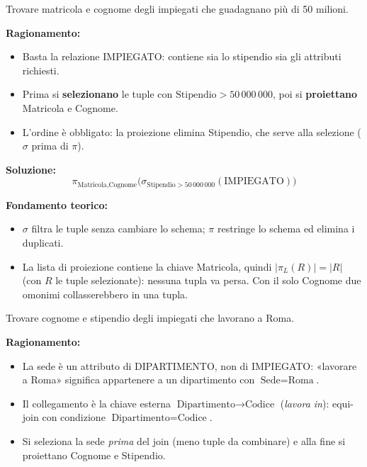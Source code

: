 \documentclass[12pt, a4paper]{article}
\begin{document}
\begin{tcolorbox}[colback=lightergray!10, colframe=tocsec, title=\textbf{Esercizio 1.1}]
Trovare matricola e cognome degli impiegati che guadagnano più di 50 milioni.
\end{tcolorbox}

\textbf{Ragionamento:}
\begin{itemize}
\item Basta la relazione IMPIEGATO: contiene sia lo stipendio sia gli attributi richiesti.
\item Prima si \textbf{selezionano} le tuple con $\text{Stipendio}>50\,000\,000$, poi si \textbf{proiettano} Matricola e Cognome.
\item L'ordine è obbligato: la proiezione elimina Stipendio, che serve alla selezione ($\sigma$ prima di $\pi$).
\end{itemize}

\textbf{Soluzione:}
$$\pi_{\text{Matricola},\text{Cognome}}\big(\sigma_{\text{Stipendio}>50\,000\,000}(\text{IMPIEGATO})\big)$$

\textbf{Fondamento teorico:}
\begin{itemize}
\item $\sigma$ filtra le tuple senza cambiare lo schema; $\pi$ restringe lo schema ed elimina i duplicati.
\item La lista di proiezione contiene la chiave Matricola, quindi $|\pi_L(R)|=|R|$ (con $R$ le tuple selezionate): nessuna tupla va persa. Con il solo Cognome due omonimi collasserebbero in una tupla.
\end{itemize}

\begin{tcolorbox}[colback=lightergray!10, colframe=tocsec, title=\textbf{Esercizio 1.2}]
Trovare cognome e stipendio degli impiegati che lavorano a Roma.
\end{tcolorbox}

\textbf{Ragionamento:}
\begin{itemize}
\item La sede è un attributo di DIPARTIMENTO, non di IMPIEGATO: «lavorare a Roma» significa appartenere a un dipartimento con $\text{Sede}=\text{Roma}$.
\item Il collegamento è la chiave esterna $\text{Dipartimento}\to\text{Codice}$ (\emph{lavora in}): equi-join con condizione $\text{Dipartimento}=\text{Codice}$.
\item Si seleziona la sede \emph{prima} del join (meno tuple da combinare) e alla fine si proiettano Cognome e Stipendio.
\end{itemize}
\end{document}
